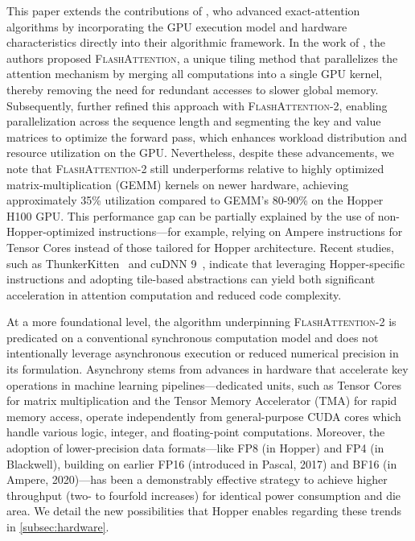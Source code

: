 This paper extends the contributions of \citet{dao2022flashattention}, who advanced exact-attention algorithms by incorporating the GPU execution model and hardware characteristics directly into their algorithmic framework. In the work of \citet{dao2022flashattention}, the authors proposed \textsc{FlashAttention}, a unique tiling method that parallelizes the attention mechanism by merging all computations into a single GPU kernel, thereby removing the need for redundant accesses to slower global memory. Subsequently, \citet{dao2023flashattention2} further refined this approach with \textsc{FlashAttention-2}, enabling parallelization across the sequence length and segmenting the key and value matrices to optimize the forward pass, which enhances workload distribution and resource utilization on the GPU. Nevertheless, despite these advancements, we note that \textsc{FlashAttention-2} still underperforms relative to highly optimized matrix-multiplication (GEMM) kernels on newer hardware, achieving approximately 35\% utilization compared to GEMM's 80-90\% on the Hopper H100 GPU. This performance gap can be partially explained by the use of non-Hopper-optimized instructions—for example, relying on Ampere instructions for Tensor Cores instead of those tailored for Hopper architecture. Recent studies, such as ThunkerKitten~\citep{spector2024thunder} and cuDNN 9~\citep{cudnn9}, indicate that leveraging Hopper-specific instructions and adopting tile-based abstractions can yield both significant acceleration in attention computation and reduced code complexity.

At a more foundational level, the algorithm underpinning \textsc{FlashAttention-2} is predicated on a conventional synchronous computation model and does not intentionally leverage asynchronous execution or reduced numerical precision in its formulation. Asynchrony stems from advances in hardware that accelerate key operations in machine learning pipelines—dedicated units, such as Tensor Cores for matrix multiplication and the Tensor Memory Accelerator (TMA) for rapid memory access, operate independently from general-purpose CUDA cores which handle various logic, integer, and floating-point computations. Moreover, the adoption of lower-precision data formats—like FP8 (in Hopper) and FP4 (in Blackwell), building on earlier FP16 (introduced in Pascal, 2017) and BF16 (in Ampere, 2020)—has been a demonstrably effective strategy to achieve higher throughput (two- to fourfold increases) for identical power consumption and die area. We detail the new possibilities that Hopper enables regarding these trends in \cref{subsec:hardware}.

